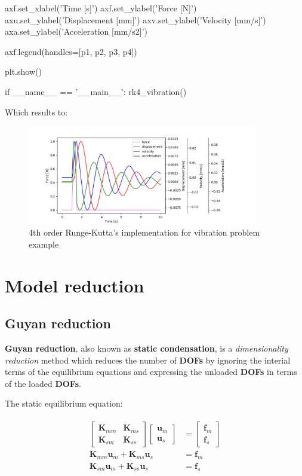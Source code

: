 \documentclass[10pt,b5paper,titlepage]{book}
\newenvironment{eqarray}
{
    \begin{eqnarray}
        \begin{aligned}
}
{
        \end{aligned}
    \end{eqnarray}
}
\begin{document}
\begin{python}
    axf.set_xlabel('Time [s]')
    axf.set_ylabel('Force [N]')
    axu.set_ylabel('Displacement [mm]')
    axv.set_ylabel('Velocity [mm/s]')
    axa.set_ylabel('Acceleration [mm/s2]')

    axf.legend(handles=[p1, p2, p3, p4])

    plt.show()

if __name__ == '__main__':
    rk4_vibration()

\end{python}

Which results to:
\begin{figure}[ht]
    \centering
    \includegraphics[width=0.90\textwidth]{img/rk4_example.png}
    \caption{4th order Runge-Kutta's implementation for vibration problem example}
    \label{fig:rk4-example-png}
\end{figure}



\newpage
\chapter{Model reduction}

\section{Guyan reduction}
\textbf{Guyan reduction}, also known as \textbf{static condensation},
is a \textit{dimensionality reduction} method which reduces the number
of \textbf{DOFs} by ignoring the interial terms of the equilibrium equations
and expressing the unloaded \textbf{DOFs} in terms of the loaded \textbf{DOFs}.

The static equilibrium equation:

\begin{eqarray}
    \begin{bmatrix}
        \mathbf{K}_{mm} & \mathbf{K}_{ms} \\
        \mathbf{K}_{sm} & \mathbf{K}_{ss}
    \end{bmatrix}
    \begin{bmatrix}
        \mathbf{u}_m \\
        \mathbf{u}_s
    \end{bmatrix} &=
    \begin{bmatrix}
        \mathbf{f}_m \\
        \mathbf{f}_s
    \end{bmatrix} \\
    \mathbf{K}_{mm} \mathbf{u}_m + \mathbf{K}_{ms} \mathbf{u}_s &= \mathbf{f}_m \\
    \mathbf{K}_{sm} \mathbf{u}_m + \mathbf{K}_{ss} \mathbf{u}_s &= \mathbf{f}_s
\end{eqarray}
\end{document}
